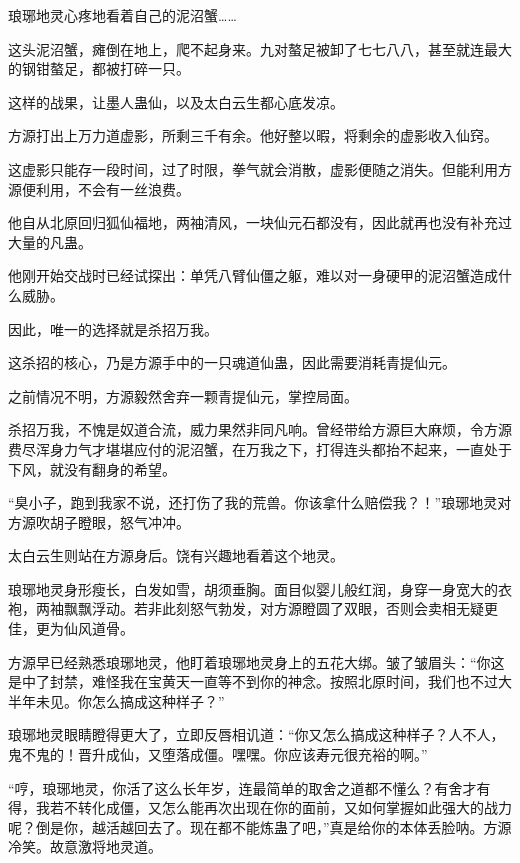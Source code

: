 
\begin{this_body}



琅琊地灵心疼地看着自己的泥沼蟹……

这头泥沼蟹，瘫倒在地上，爬不起身来。九对螯足被卸了七七八八，甚至就连最大的钢钳螯足，都被打碎一只。

这样的战果，让墨人蛊仙，以及太白云生都心底发凉。

方源打出上万力道虚影，所剩三千有余。他好整以暇，将剩余的虚影收入仙窍。

这虚影只能存一段时间，过了时限，拳气就会消散，虚影便随之消失。但能利用方源便利用，不会有一丝浪费。

他自从北原回归狐仙福地，两袖清风，一块仙元石都没有，因此就再也没有补充过大量的凡蛊。

他刚开始交战时已经试探出：单凭八臂仙僵之躯，难以对一身硬甲的泥沼蟹造成什么威胁。

因此，唯一的选择就是杀招万我。

这杀招的核心，乃是方源手中的一只魂道仙蛊，因此需要消耗青提仙元。

之前情况不明，方源毅然舍弃一颗青提仙元，掌控局面。

杀招万我，不愧是奴道合流，威力果然非同凡响。曾经带给方源巨大麻烦，令方源费尽浑身力气才堪堪应付的泥沼蟹，在万我之下，打得连头都抬不起来，一直处于下风，就没有翻身的希望。

“臭小子，跑到我家不说，还打伤了我的荒兽。你该拿什么赔偿我？！”琅琊地灵对方源吹胡子瞪眼，怒气冲冲。

太白云生则站在方源身后。饶有兴趣地看着这个地灵。

琅琊地灵身形瘦长，白发如雪，胡须垂胸。面目似婴儿般红润，身穿一身宽大的衣袍，两袖飘飘浮动。若非此刻怒气勃发，对方源瞪圆了双眼，否则会卖相无疑更佳，更为仙风道骨。

方源早已经熟悉琅琊地灵，他盯着琅琊地灵身上的五花大绑。皱了皱眉头：“你这是中了封禁，难怪我在宝黄天一直等不到你的神念。按照北原时间，我们也不过大半年未见。你怎么搞成这种样子？”

琅琊地灵眼睛瞪得更大了，立即反唇相讥道：“你又怎么搞成这种样子？人不人，鬼不鬼的！晋升成仙，又堕落成僵。嘿嘿。你应该寿元很充裕的啊。”

“哼，琅琊地灵，你活了这么长年岁，连最简单的取舍之道都不懂么？有舍才有得，我若不转化成僵，又怎么能再次出现在你的面前，又如何掌握如此强大的战力呢？倒是你，越活越回去了。现在都不能炼蛊了吧，”真是给你的本体丢脸呐。方源冷笑。故意激将地灵道。


\end{this_body}
